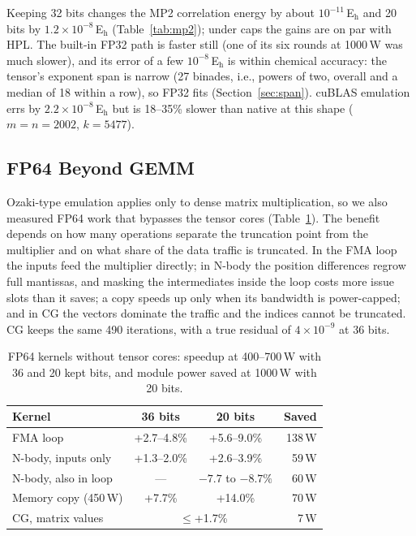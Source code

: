 \documentclass[conference]{IEEEtran}
\newcommand{\W}{\,W}
\newcommand{\Eh}{\,E$_\mathrm{h}$}
\newcommand{\ee}[2]{#1{\times}10^{#2}}  %
\newcommand{\pct}{\%}
\begin{document}
Keeping 32 bits changes the MP2 correlation energy by about $10^{-11}$\Eh{} and 20 bits by $\ee{1.2}{-8}$\Eh{}
(Table~\ref{tab:mp2}); under caps the gains are on par with HPL. The built-in FP32 path is faster still (one of its six
rounds at 1000\W{} was much slower), and its error of a few $10^{-8}$\Eh{} is within chemical accuracy: the tensor's
exponent span is narrow (27 binades, i.e., powers of two, overall and a median of 18 within a row), so FP32 fits
(Section~\ref{sec:span}). cuBLAS emulation errs by $\ee{2.2}{-8}$\Eh{} but is 18--35\pct{} slower than native at this
shape ($m=n=2002$, $k=5477$).

\subsection{FP64 Beyond GEMM}\label{sec:nongemm}

Ozaki-type emulation applies only to dense matrix multiplication, so we also measured FP64 work that bypasses the
tensor cores (Table~\ref{tab:nongemm}). The benefit depends on how many operations separate the truncation point
from the multiplier and on what share of the data traffic is truncated. In the FMA loop the inputs feed the
multiplier directly; in N-body the position differences regrow full mantissas, and masking the intermediates inside
the loop costs more issue slots than it saves; a copy speeds up only when its bandwidth is power-capped; and in CG
the vectors dominate the traffic and the indices cannot be truncated. CG keeps the same 490 iterations, with a true
residual of $\ee{4}{-9}$ at 36 bits.

\begin{table}[t]
\caption{FP64 kernels without tensor cores: speedup at 400--700\W{} with 36 and 20 kept bits, and module power
saved at 1000\W{} with 20 bits.}\label{tab:nongemm}
\centering\footnotesize\setlength{\tabcolsep}{4pt}
\begin{tabular}{@{}lccr@{}}
\toprule
Kernel & 36 bits & 20 bits & Saved \\
\midrule
FMA loop & +2.7--4.8\pct & +5.6--9.0\pct & 138\W \\
N-body, inputs only & +1.3--2.0\pct & +2.6--3.9\pct & 59\W \\
N-body, also in loop & --- & $-7.7$ to $-8.7\pct$ & 60\W \\
Memory copy (450\W) & +7.7\pct & +14.0\pct & 70\W \\
CG, matrix values & \multicolumn{2}{c}{$\le$+1.7\pct} & 7\W \\
\bottomrule
\end{tabular}
\end{table}
\end{document}
